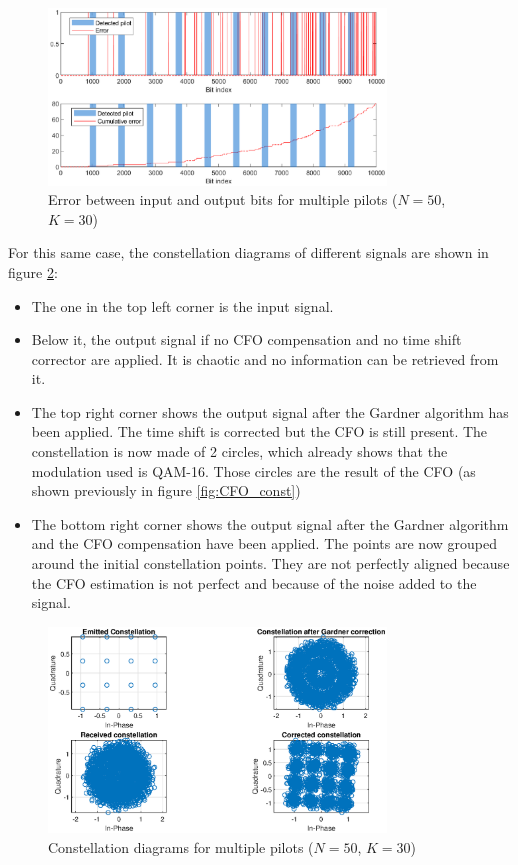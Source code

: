 \documentclass[10pt,a4paper]{ULBreport}
\begin{document}
\begin{figure}[H]
    \centering
    \includegraphics[width=0.8\textwidth]{pic/full_1.eps}
    \caption{Error between input and output bits for multiple pilots ($N=50$, $K=30$)}
    \label{fig:full_1}
\end{figure}

For this same case, the constellation diagrams of different signals are shown in figure \ref{fig:full_2}: 
\begin{itemize}
    \item The one in the top left corner is the input signal. 
    \item Below it, the output signal if no CFO compensation and no time shift corrector are applied. It is chaotic and no information can be retrieved from it.
    \item The top right corner shows the output signal after the Gardner algorithm has been applied. The time shift is corrected but the CFO is still present. The constellation is now made of 2 circles, which already shows that the modulation used is QAM-16. Those circles are the result of the CFO (as shown previously in figure \ref{fig:CFO_const})
    \item The bottom right corner shows the output signal after the Gardner algorithm and the CFO compensation have been applied. The points are now grouped around the initial constellation points. They are not perfectly aligned because the CFO estimation is not perfect and because of the noise added to the signal.
\end{itemize}

\begin{figure}[H]
    \centering
    \includegraphics[width=0.8\textwidth]{pic/full_2.eps}
    \caption{Constellation diagrams for multiple pilots ($N=50$, $K=30$)}
    \label{fig:full_2}
\end{figure}




\end{document}

